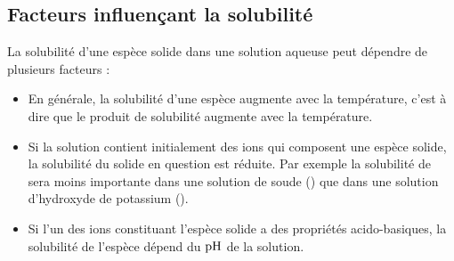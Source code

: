 \documentclass{cours}
\begin{document}
\subsection{Facteurs influençant la solubilité}%
\label{sub:facteurs_influencant_la_solubilite}
La solubilité d'une espèce solide dans une solution aqueuse peut dépendre de plusieurs facteurs :
\begin{itemize}
  \item En générale, la solubilité d'une espèce augmente avec la température, c'est à dire que le produit de solubilité augmente avec la température.

  \item Si la solution contient initialement des ions qui composent une espèce solide, la solubilité du solide en question est réduite. Par exemple la solubilité de  sera moins importante dans une solution de soude () que dans une solution d'hydroxyde de potassium ().

  \item Si l'un des ions constituant l'espèce solide a des propriétés acido-basiques, la solubilité de l'espèce dépend du $\mathrm{pH}$ de la solution. 
\end{itemize}
\end{document}
